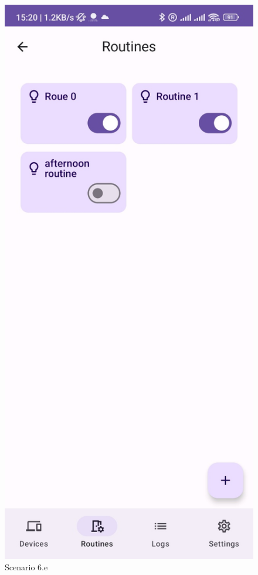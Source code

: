 \begin{enumerate}
\begin{enumerate}
    \begin{figure}
        \centering
        \includegraphics[width=0.5\linewidth]{imgs//usercase/scenario6-c.jpg}
        \caption{Scenario 6.e}
        \label{fig:enter-label}
    \end{figure}
    \end{enumerate}
\end{enumerate}